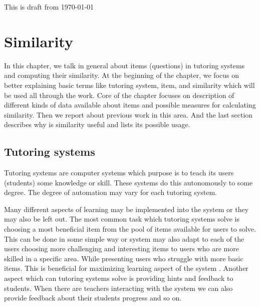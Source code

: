 \documentclass[
  digital, %
  table,   %
  nolof,     %
  nolot,     %
  nocover,
  color,
  final, %
]{fithesis3}
\begin{document}
This is draft from \today %

\chapter{Similarity}



In this chapter, we talk in general about items (questions) in tutoring systems and computing their similarity. At the beginning of the chapter, we focus on better explaining basic terms like tutoring system, item, and similarity which will be used all through the work. Core of the chapter focuses on description of different kinds of data available about items and possible measures for calculating similarity. Then we report about previous work in this area. And the last section describes why is similarity useful and lists its possible usage.


\section{Tutoring systems}\label{tutoring-systems}

Tutoring systems are computer systems which purpose is to teach its users (students) some knowledge or skill. These systems do this autonomously to some degree. The degree of automation may vary for each tutoring system.


Many different aspects of learning may be implemented into the system or they may also be left out. The most common task which tutoring systems solve is choosing a most beneficial item from the pool of items available for users to solve. This can be done in some simple way or system may also adapt to each of the users choosing more challenging and interesting items to users who are more skilled in a specific area. While presenting users who struggle with more basic items. This is beneficial for maximizing learning aspect of the system \cite{papouvsek2015impact}. Another aspect which can tutoring systems solve is providing hints and feedback to students. When there are teachers interacting with the system we can also provide feedback about their students progress and so on.

\end{document}

